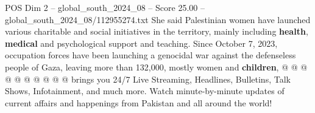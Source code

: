 \begin{textsample}{POS Dim 2 – global\_south\_2024\_08 – Score 25.00 – global\_south\_2024\_08/112955274.txt}
She said Palestinian women have launched various charitable and social initiatives in the territory, mainly including \textbf{health}, \textbf{medical} and psychological support and teaching.
Since October 7, 2023, occupation forces have been launching a genocidal war against the defenseless people of Gaza, leaving more than 132,000, mostly women and \textbf{children}, @ @ @ @ @ @ @ @ @ @ brings you 24/7 Live Streaming, Headlines, Bulletins, Talk Shows, Infotainment, and much more.
Watch minute-by-minute updates of current affairs and happenings from Pakistan and all around the world!

\end{textsample}

